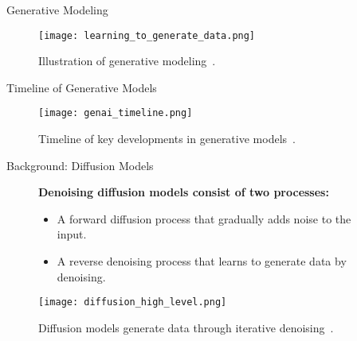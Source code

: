 \begin{refsection}
  \begin{frame}{Generative Modeling}
    \begin{figure}
      \centering
      \texttt{[image: learning\_to\_generate\_data.png]}
      \caption{\scriptsize Illustration of generative modeling~\parencite{CVPR2023Tutorial}.}
    \end{figure}
    \bottomleftrefs
  \end{frame}
  \end{refsection}
  
  \begin{refsection}
  \begin{frame}{Timeline of Generative Models}
    \begin{figure}
      \centering
      \texttt{[image: genai\_timeline.png]}
      \caption{\scriptsize Timeline of key developments in generative models~\parencite{dengPPTAdvancedNueralNetwork2024}.}
    \end{figure}
    \bottomleftrefs
  \end{frame}
  \end{refsection}
  
  
  
  \begin{refsection}
  \begin{frame}{Background: Diffusion Models}
  
    \begin{figure}
      \begin{minipage}{0.95\linewidth}
        \footnotesize
        \textbf{Denoising diffusion models consist of two processes:}
        \begin{itemize}
          \item A forward diffusion process that gradually adds noise to the input.
          \item A reverse denoising process that learns to generate data by denoising.
        \end{itemize}
      \end{minipage}
      \vspace{2em}
  
      \centering
      \texttt{[image: diffusion\_high\_level.png]}
  
      \caption[]{\scriptsize Diffusion models generate data through iterative denoising~\parencite{sohl2015deep,ho2020denoising}.}
    \end{figure}
  
    \bottomleftrefs
  \end{frame}
  \end{refsection}
  
